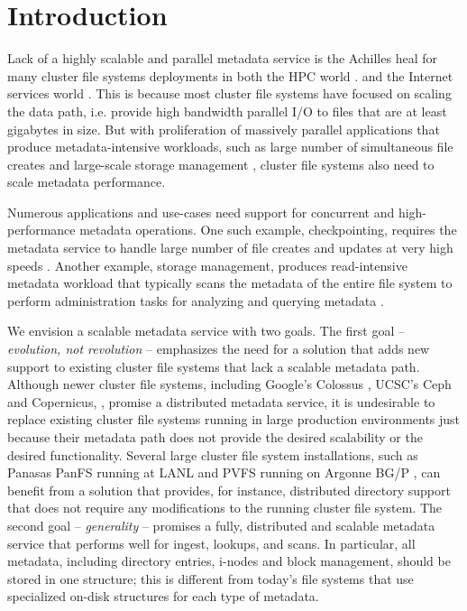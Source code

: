 \section{Introduction}

Lack of a highly scalable and parallel metadata service is the 
Achilles heal for many cluster file systems deployments in both the HPC world 
\citep{hecfsio:tr06, hpcs-io:2008}.
and the Internet services world \citep{HDFS}.
This is because most cluster file systems have focused on scaling the
data path, i.e. provide high bandwidth parallel I/O to files that are 
at least gigabytes in size.
But with proliferation of massively parallel applications that produce 
metadata-intensive workloads, such as large number of simultaneous file creates
\cite{PLFS} and large-scale storage management \cite{issdm}, cluster file systems 
also need to scale metadata performance.

Numerous applications and use-cases need support for concurrent and 
high-performance metadata operations.
One such example, checkpointing, requires the metadata service to
handle large number of file creates and updates at very high speeds 
\cite{PLFS}.
Another example, storage management, produces read-intensive metadata workload
that typically scans the metadata of the entire file system to perform
administration tasks for analyzing and querying metadata \cite{filemgmt-ucsc, magellan-ucsc}.

We envision a scalable metadata service with two goals. 
The first goal -- \textit{evolution, not revolution} -- emphasizes the need for
a solution that adds new support to existing cluster file systems that lack a 
scalable metadata path.
Although newer cluster file systems, including Google's Colossus 
\citep{50mfiles-in-googlefs:fikes10}, UCSC's Ceph and Copernicus,
\citep{ceph:weil06, sfs-ucsc}, promise a distributed metadata service, it is 
undesirable to replace existing cluster file systems running in large production
environments just because their metadata path does not provide the desired
scalability or the desired functionality.
Several large cluster file system installations, such as Panasas PanFS running
at LANL \cite{cielo} and PVFS running on Argonne BG/P 
\cite{pvfs:www,bgp}, can 
benefit from a solution that provides, for instance, distributed directory support 
that does not require any modifications to the running cluster file system.
The second goal -- \textit{generality} -- promises a fully, distributed and
scalable metadata service that performs well for ingest, lookups, and scans.
In particular, all metadata, including directory entries, i-nodes and block
management, should be stored in one structure; this is different from
today's file systems that use specialized on-disk structures for each type of 
metadata.

